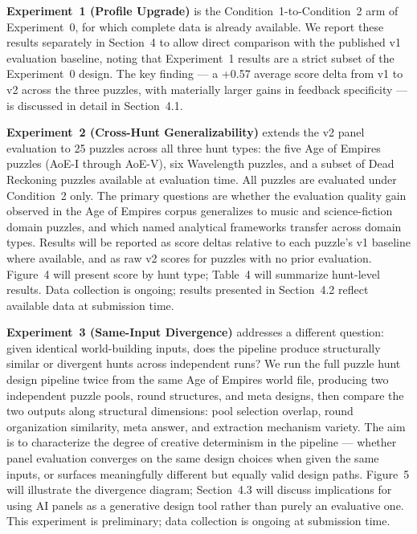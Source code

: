 \textbf{Experiment~1 (Profile Upgrade)} is the Condition~1-to-Condition~2 arm of Experiment~0, for which complete data is already available. We report these results separately in Section~4 to allow direct comparison with the published v1 evaluation baseline, noting that Experiment~1 results are a strict subset of the Experiment~0 design. The key finding --- a +0.57 average score delta from v1 to v2 across the three puzzles, with materially larger gains in feedback specificity --- is discussed in detail in Section~4.1.

\textbf{Experiment~2 (Cross-Hunt Generalizability)} extends the v2 panel evaluation to 25 puzzles across all three hunt types: the five Age of Empires puzzles (AoE-I through AoE-V), six Wavelength puzzles, and a subset of Dead Reckoning puzzles available at evaluation time. All puzzles are evaluated under Condition~2 only. The primary questions are whether the evaluation quality gain observed in the Age of Empires corpus generalizes to music and science-fiction domain puzzles, and which named analytical frameworks transfer across domain types. Results will be reported as score deltas relative to each puzzle's v1 baseline where available, and as raw v2 scores for puzzles with no prior evaluation. Figure~4 will present score by hunt type; Table~4 will summarize hunt-level results. Data collection is ongoing; results presented in Section~4.2 reflect available data at submission time.

\textbf{Experiment~3 (Same-Input Divergence)} addresses a different question: given identical world-building inputs, does the pipeline produce structurally similar or divergent hunts across independent runs? We run the full puzzle hunt design pipeline twice from the same Age of Empires world file, producing two independent puzzle pools, round structures, and meta designs, then compare the two outputs along structural dimensions: pool selection overlap, round organization similarity, meta answer, and extraction mechanism variety. The aim is to characterize the degree of creative determinism in the pipeline --- whether panel evaluation converges on the same design choices when given the same inputs, or surfaces meaningfully different but equally valid design paths. Figure~5 will illustrate the divergence diagram; Section~4.3 will discuss implications for using AI panels as a generative design tool rather than purely an evaluative one. This experiment is preliminary; data collection is ongoing at submission time.

